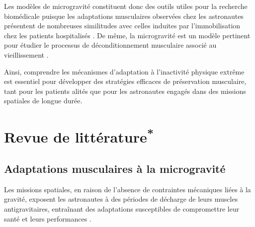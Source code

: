 \documentclass[11pt]{report}
\begin{document}
Les modèles de microgravité constituent donc des outils utiles pour la recherche biomédicale puisque les adaptations musculaires observées chez les astronautes présentent de nombreuses similitudes avec celles induites par l'immobilisation chez les patients hospitalisés \parencite{hardy_time_2022}. De même, la microgravité est un modèle pertinent pour étudier le processus de déconditionnement musculaire associé au vieillissement \parencite{raffin_sedentary_2023}.

\medskip Ainsi, comprendre les mécanismes d'adaptation à l'inactivité physique extrême est essentiel pour développer des stratégies efficaces de préservation musculaire, tant pour les patients alités que pour les astronautes engagés dans des missions spatiales de longue durée.

\chapter[Revue de littérature]{Revue de littérature\textsuperscript{*}}

\begingroup
\renewcommand{\thefootnote}{*}
\endgroup

\section{Adaptations musculaires à la microgravité}

Les missions spatiales, en raison de l'absence de contraintes mécaniques liées à la gravité, exposent les astronautes à des périodes de décharge de leurs muscles antigravitaires, entraînant des adaptations susceptibles de compromettre leur santé et leurs performances \parencite{adams_skeletal_2003}.
\end{document}

